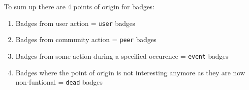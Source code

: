 \documentclass[]{book}
\providecommand{\tightlist}{%
  \setlength{\itemsep}{0pt}\setlength{\parskip}{0pt}}
\theoremstyle{definition}
\theoremstyle{definition}
\theoremstyle{definition}
\theoremstyle{remark}
\begin{document}
To sum up there are 4 points of origin for badges:

\begin{enumerate}
\def\labelenumi{\arabic{enumi})}
\tightlist
\item
  Badges from user action = \texttt{user} badges
\item
  Badges from community action = \texttt{peer} badges
\item
  Badges from some action during a specified occurence = \texttt{event}
  badges
\item
  Badges where the point of origin is not interesting anymore as they
  are now non-funtional = \texttt{dead} badges
\end{enumerate}

\begin{landscape}


\end{landscape}
\end{document}
